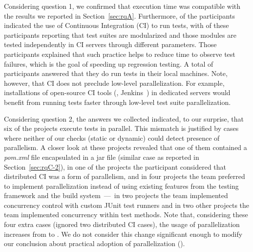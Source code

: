 Considering question 1, we confirmed that execution time was
compatible with the results we reported in Section~\ref{sec:rqA}.
Furthermore, \emailsCI{} of the participants indicated the use of
Continuous Integration (CI) to run tests, with \emailsDistributed{} of
these participants reporting that test suites are modularized and
those modules are tested independently in CI servers through different
parameters.  Those participants explained that such practice helps to
reduce time to observe test failures, which is the goal of speeding up
regression testing.  A total of \emailsLocal{} participants answered
that they do run tests in their local machines.  Note, however, that
CI does not preclude low-level parallelization.  For example,
installations of open-source CI tools (\eg{}, Jenkins~\cite{jenkins})
in dedicated servers would benefit from running tests faster through
low-level test suite parallelization.

Considering question 2, the answers we collected indicated, to our
surprise, that six of the \emailsProjectsAnswered{} projects execute
tests in parallel.  This mismatch is justified by cases where neither
of our checks (static or dynamic) could detect presence of
parallelism.  A closer look at these projects revealed that one of
them contained a \emph{pom.xml} file encapsulated in a jar file
(similar case as reported in Section~\ref{sec:rqC-2}), in one of the
projects the participant considered that distributed CI was a form of
parallelism, and in four projects the team preferred to implement
parallelization instead of using existing features from the testing
framework and the build system~---~in two projects the team
implemented concurrency control with custom JUnit test runners and in
two other projects the team implemented concurrency within test
methods.  Note that, considering these four extra cases (ignored two
distributed CI cases), the usage of parallelization increases from
\percentParallel{} to \percentParallelUpdated{}.  We do not consider
this change significant enough to modify our conclusion about
practical adoption of parallelization (\numRQAdoptionOne{}).


